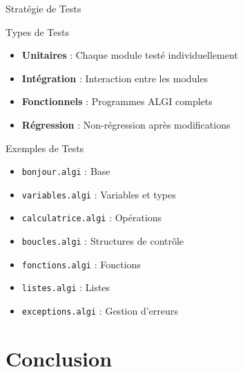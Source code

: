 \documentclass[10pt]{beamer}
\begin{document}
\begin{frame}{Stratégie de Tests}
    \begin{block}{Types de Tests}
        \begin{itemize}
            \item \textbf{Unitaires} : Chaque module testé individuellement
            \item \textbf{Intégration} : Interaction entre les modules
            \item \textbf{Fonctionnels} : Programmes ALGI complets
            \item \textbf{Régression} : Non-régression après modifications
        \end{itemize}
    \end{block}
    
    \begin{block}{Exemples de Tests}
        \begin{itemize}
            \item \texttt{bonjour.algi} : Base
            \item \texttt{variables.algi} : Variables et types
            \item \texttt{calculatrice.algi} : Opérations
            \item \texttt{boucles.algi} : Structures de contrôle
            \item \texttt{fonctions.algi} : Fonctions
            \item \texttt{listes.algi} : Listes
            \item \texttt{exceptions.algi} : Gestion d'erreurs
        \end{itemize}
    \end{block}
\end{frame}



\section{Conclusion}
\end{document}
